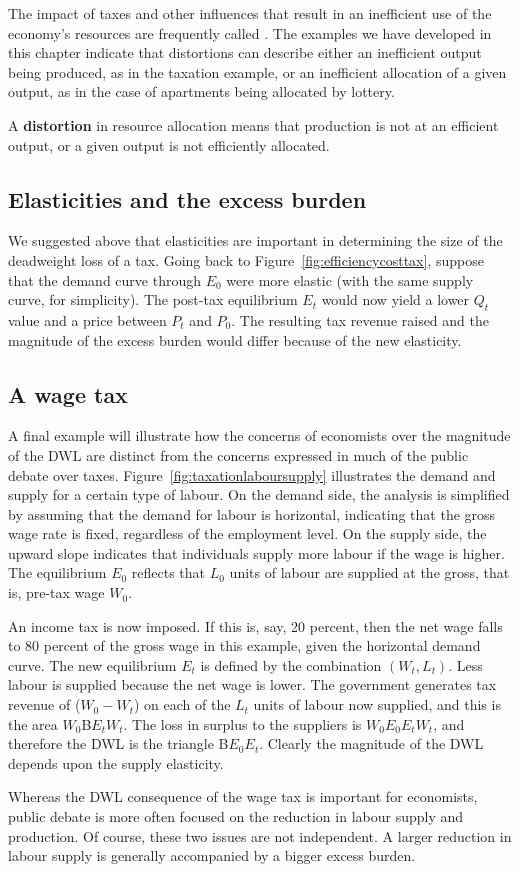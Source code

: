 The impact of taxes and other influences that result in an inefficient use of the economy's resources are frequently called . The examples we have developed in this chapter indicate that distortions can describe either an inefficient output being produced, as in the taxation example, or an inefficient allocation of a given output, as in the case of apartments being allocated by lottery.

\begin{DefBox}
A \textbf{distortion} in resource allocation means that production is not at an efficient output, or a given output is not efficiently allocated.
\end{DefBox}

\subsection*{Elasticities and the excess burden}

We suggested above that elasticities are important in determining the size of the deadweight loss of a tax. Going back to Figure~\ref{fig:efficiencycosttax}, suppose that the demand curve through $E_0$ were more elastic (with the same supply curve, for simplicity). The post-tax equilibrium $E_t$ would now yield a lower $Q_t$ value and a price between $P_t$ and $P_0$. The resulting tax revenue raised and the magnitude of the excess burden would differ because of the new elasticity.

\subsection*{A wage tax}

A final example will illustrate how the concerns of economists over the magnitude of the DWL are distinct from the concerns expressed in much of the public debate over taxes. Figure~\ref{fig:taxationlaboursupply} illustrates the demand and supply for a certain type of labour. On the demand side, the analysis is simplified by assuming that the demand for labour is horizontal, indicating that the gross wage rate is fixed, regardless of the employment level. On the supply side, the upward slope indicates that individuals supply more labour if the wage is higher. The equilibrium $E_0$ reflects that $L_0$ units of labour are supplied at the gross, that is, pre-tax wage $W_0$.



An income tax is now imposed. If this is, say, 20 percent, then the net wage falls to 80 percent of the gross wage in this example, given the horizontal demand curve. The new equilibrium $E_t$ is defined by the combination $(W_t,L_t)$. Less labour is supplied because the net wage is lower. The government generates tax revenue of ($W_0-W_t$) on each of the $L_t$ units of labour now supplied, and this is the area $W_0$B$E_tW_t$. The loss in surplus to the suppliers is $W_0E_0E_tW_t$, and therefore the DWL is the triangle B$E_0E_t$. Clearly the magnitude of the DWL depends upon the supply elasticity.

Whereas the DWL consequence of the wage tax is important for economists, public debate is more often focused on the reduction in labour supply and production. Of course, these two issues are not independent. A larger reduction in labour supply is generally accompanied by a bigger excess burden.